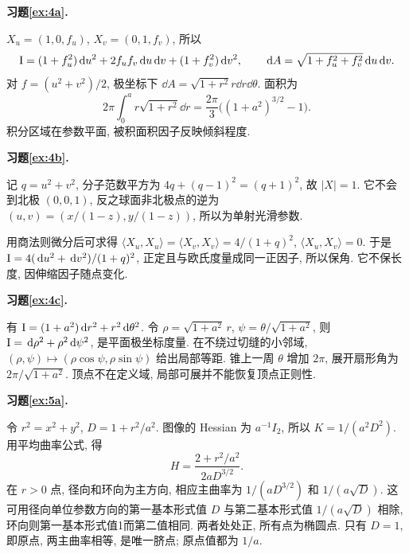 \par{}
\noindent\textbf{习题\ref{ex:4a}.}
\begin{solution}
$X_u=(1,0,f_u)$, $X_v=(0,1,f_v)$, 所以
\[
 \mathrm{I}=(1+f_u^2)\,\mathrm d u^2+2f_uf_v\,\mathrm d u\,\mathrm d v+(1+f_v^2)\,\mathrm d v^2,\qquad
 \,\mathrm d A=\sqrt{1+f_u^2+f_v^2}\,\mathrm d u\,\mathrm d v.
\]
对 $f=(u^2+v^2)/2$, 极坐标下 $\dd A=\sqrt{1+r^2}r\dd r\dd\theta$. 面积为
\[
 2\pi\int_0^a r\sqrt{1+r^2}\dd r
 =\frac{2\pi}3\bigl((1+a^2)^{3/2}-1\bigr).
\]
积分区域在参数平面, 被积面积因子反映倾斜程度.
\end{solution}
\par{}
\noindent\textbf{习题\ref{ex:4b}.}
\begin{solution}
记 $q=u^2+v^2$, 分子范数平方为 $4q+(q-1)^2=(q+1)^2$, 故 $|X|=1$. 它不会到北极 $(0,0,1)$, 反之球面非北极点的逆为 $(u,v)=(x/(1-z),y/(1-z))$, 所以为单射光滑参数.

用商法则微分后可求得 $\langle X_u,X_u\rangle=\langle X_v,X_v\rangle=4/(1+q)^2$, $\langle X_u,X_v\rangle=0$. 于是 $\mathrm{I}=4(\,\mathrm d u^2+\,\mathrm d v^2)/(1+q)^2$, 正定且与欧氏度量成同一正因子, 所以保角. 它不保长度, 因伸缩因子随点变化.
\end{solution}
\par{}
\noindent\textbf{习题\ref{ex:4c}.}
\begin{solution}
有 $\mathrm{I}=(1+a^2)\,\mathrm d r^2+r^2\,\mathrm d\theta^2$. 令 $\rho=\sqrt{1+a^2}\,r$, $\psi=\theta/\sqrt{1+a^2}$, 则 $\mathrm{I}=\,\mathrm d\rho^2+\rho^2\,\mathrm d\psi^2$, 是平面极坐标度量. 在不绕过切缝的小邻域, $(\rho,\psi)\mapsto(\rho\cos\psi,\rho\sin\psi)$ 给出局部等距. 锥上一周 $\theta$ 增加 $2\pi$, 展开扇形角为 $2\pi/\sqrt{1+a^2}$. 顶点不在定义域, 局部可展并不能恢复顶点正则性.
\end{solution}
\par{}
\par{}
\noindent\textbf{习题\ref{ex:5a}.}
\begin{solution}
令 $r^2=x^2+y^2$, $D=1+r^2/a^2$. 图像的 Hessian 为 $a^{-1}I_2$, 所以 $K=1/(a^2D^2)$. 用平均曲率公式, 得
\[
 H=\frac{2+r^2/a^2}{2aD^{3/2}}.
\]
在 $r>0$ 点, 径向和环向为主方向, 相应主曲率为 $1/(aD^{3/2})$ 和 $1/(a\sqrt D)$. 这可用径向单位参数方向的第一基本形式值 $D$ 与第二基本形式值 $1/(a\sqrt D)$ 相除, 环向则第一基本形式值1而第二值相同. 两者处处正, 所有点为椭圆点. 只有 $D=1$, 即原点, 两主曲率相等, 是唯一脐点; 原点值都为 $1/a$.
\end{solution}
\par{}
